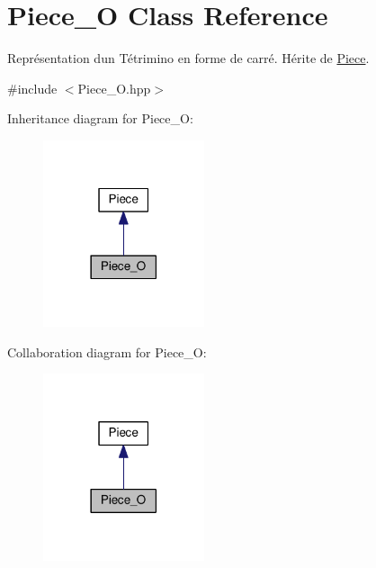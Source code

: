 \hypertarget{classPiece__O}{}\section{Piece\+\_\+O Class Reference}
\label{classPiece__O}


Représentation d\textquotesingle{}un Tétrimino en forme de carré. Hérite de \hyperlink{classPiece}{Piece}.  




{\ttfamily \#include $<$Piece\+\_\+\+O.\+hpp$>$}



Inheritance diagram for Piece\+\_\+O\+:
\nopagebreak
\begin{figure}[H]
\begin{center}
\leavevmode
\includegraphics[width=134pt]{classPiece__O__inherit__graph}
\end{center}
\end{figure}


Collaboration diagram for Piece\+\_\+O\+:
\nopagebreak
\begin{figure}[H]
\begin{center}
\leavevmode
\includegraphics[width=134pt]{classPiece__O__coll__graph}
\end{center}
\end{figure}
